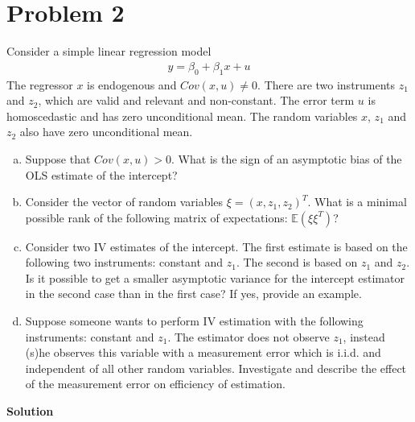 \documentclass[a4paper]{article}
\newcommand{\expect}{\mathbb{E}}
\begin{document}
\section*{Problem 2}
Consider a simple linear regression model
\begin{align*}
y = \beta_0 + \beta_1x + u
\end{align*}
The regressor $x$ is endogenous and $Cov(x, u) \neq 0$. There are two instruments $z_1$ and $z_2$, which
are valid and relevant and non-constant. The error term $u$ is homoscedastic and has zero
unconditional mean. The random variables $x$, $z_1$ and $z_2$ also have zero unconditional mean.
\begin{enumerate}[(a)]
\item Suppose that $Cov(x, u) > 0$. What is the sign of an asymptotic bias of the OLS estimate
of the intercept?
\item Consider the vector of random variables $\xi = (x, z_1, z_2)^T$. What is a minimal possible
rank of the following matrix of expectations: $\expect (\xi\xi^T)$?
\item Consider two IV estimates of the intercept. The first estimate is based on the following
two instruments: constant and $z_1$. The second is based on $z_1$ and $z_2$. Is it possible to get
a smaller asymptotic variance for the intercept estimator in the second case than in the first
case? If yes, provide an example.
\item Suppose someone wants to perform IV estimation with the following instruments: constant and $z_1$. The estimator does not observe $z_1$, instead (s)he observes this variable with a
measurement error which is i.i.d. and independent of all other random variables. Investigate
and describe the effect of the measurement error on efficiency of estimation.

\end{enumerate}


\textbf{Solution}
\end{document}
